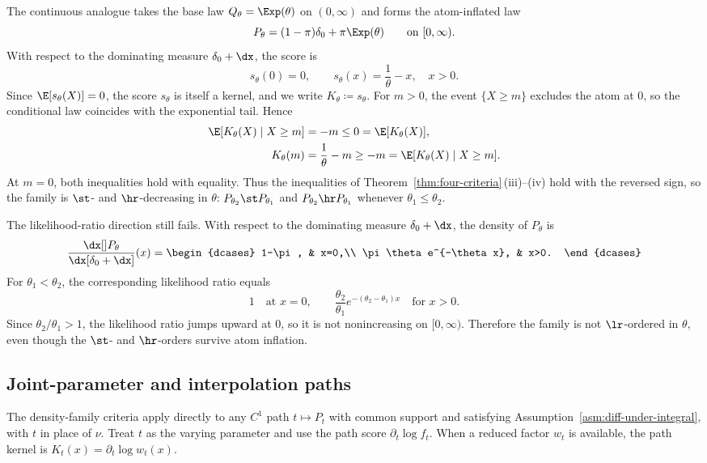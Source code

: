 \documentclass[11pt]{article}
\begin{document}
\begin{example}
\label{ex:zero-inflated-exp}
The continuous analogue takes the base law \(Q_\theta=\Exp(\theta)\) on \((0,\infty)\) and forms the atom-inflated law
\[
P_\theta=(1-\pi)\delta_0+\pi \Exp(\theta)
\qquad\text{on }[0,\infty).
\]
With respect to the dominating measure \(\delta_0+\dx\), the score is
\[
s_\theta(0)=0,\qquad
s_\theta(x)=\frac{1}{\theta}-x,\quad x>0.
\]
Since \(\E[s_\theta(X)]=0\), the score \(s_\theta\) is itself a kernel, and we write \(K_\theta\coloneqq s_\theta\). For \(m>0\), the event \(\{X\ge m\}\) excludes the atom at \(0\), so the conditional law coincides with the exponential tail. Hence
\begin{align*}
\E[K_\theta(X)\mid X\ge m]
&=-m\le 0=\E[K_\theta(X)],\\
K_\theta(m)
&=\frac{1}{\theta}-m\ge -m
=\E[K_\theta(X)\mid X\ge m].
\end{align*}
At \(m=0\), both inequalities hold with equality. Thus the inequalities of Theorem~\ref{thm:four-criteria}\,\textup{(iii)}--\textup{(iv)} hold with the reversed sign, so the family is \(\st\)- and \(\hr\)-decreasing in \(\theta\): \(P_{\theta_2}\st P_{\theta_1}\) and \(P_{\theta_2}\hr P_{\theta_1}\) whenever \(\theta_1\le\theta_2\).

The likelihood-ratio direction still fails. With respect to the dominating measure \(\delta_0+\dx\), the density of \(P_\theta\) is
\[
\frac{\dx[]P_\theta}{\dx[\delta_0+\dx]}(x)
=\begin{dcases}
1-\pi, & x=0,\\
\pi\theta e^{-\theta x}, & x>0.
\end{dcases}
\]
For \(\theta_1<\theta_2\), the corresponding likelihood ratio equals
\[
1 \quad\text{at }x=0,
\qquad
\frac{\theta_2}{\theta_1}e^{-(\theta_2-\theta_1)x}
\quad\text{for }x>0.
\]
Since \(\theta_2/\theta_1>1\), the likelihood ratio jumps upward at \(0\), so it is not nonincreasing on \([0,\infty)\). Therefore the family is not \(\lr\)-ordered in \(\theta\), even though the \(\st\)- and \(\hr\)-orders survive atom inflation.
\end{example}

\subsection{Joint-parameter and interpolation paths}
\label{sec:path-applications}

The density-family criteria apply directly to any \(C^1\) path \(t\mapsto P_t\) with common support and satisfying Assumption~\ref{asm:diff-under-integral}, with \(t\) in place of \(\nu\). Treat \(t\) as the varying parameter and use the path score \(\partial_t\log f_t\). When a reduced factor \(w_t\) is available, the path kernel is \(K_t(x)=\partial_t\log w_t(x)\).
\end{document}

